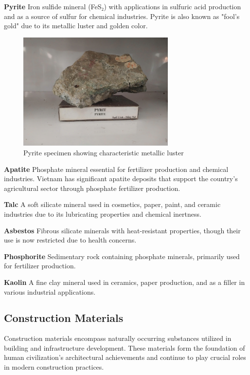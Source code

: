 \textbf{Pyrite}
Iron sulfide mineral (FeS₂) with applications in sulfuric acid production and as a source of sulfur for chemical industries. Pyrite is also known as "fool's gold" due to its metallic luster and golden color.

\begin{figure}[H]
\centering
\includegraphics[width=0.7\textwidth]{graphics/pyrite.png}
\caption{Pyrite specimen showing characteristic metallic luster}
\label{fig:pyrite}
\end{figure}

\textbf{Apatite}
Phosphate mineral essential for fertilizer production and chemical industries. Vietnam has significant apatite deposits that support the country's agricultural sector through phosphate fertilizer production.

\textbf{Talc}
A soft silicate mineral used in cosmetics, paper, paint, and ceramic industries due to its lubricating properties and chemical inertness.

\textbf{Asbestos}
Fibrous silicate minerals with heat-resistant properties, though their use is now restricted due to health concerns.

\textbf{Phosphorite}
Sedimentary rock containing phosphate minerals, primarily used for fertilizer production.

\textbf{Kaolin}
A fine clay mineral used in ceramics, paper production, and as a filler in various industrial applications.

\subsection{Construction Materials}

Construction materials encompass naturally occurring substances utilized in building and infrastructure development. These materials form the foundation of human civilization's architectural achievements and continue to play crucial roles in modern construction practices.

